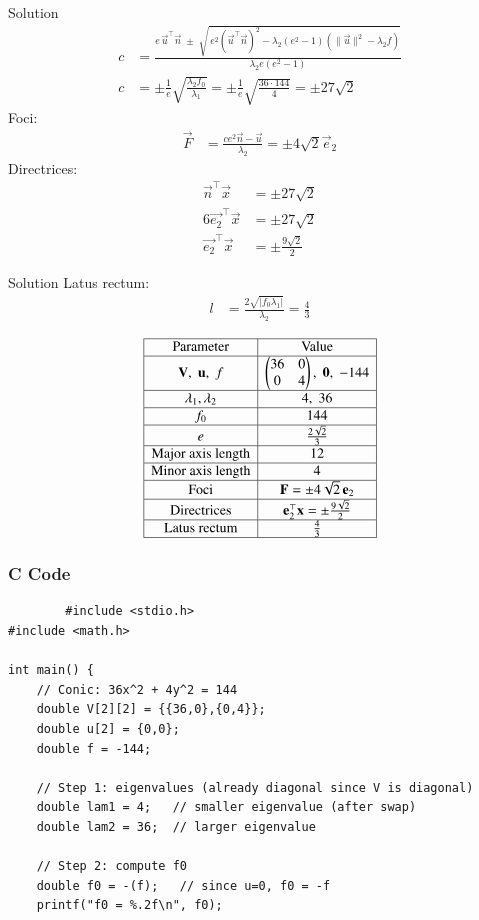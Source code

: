 \documentclass{beamer}
\begin{document}
\begin{frame}{Solution}
\begin{align}
c &= \frac{e\,\vec{u}^\top\vec{n} \;\pm\; 
\sqrt{\,e^{2}\left(\vec{u}^\top\vec{n}\right)^{2} 
- \lambda_{2}\left(e^{2}-1\right)\left(\|\vec{u}\|^{2}-\lambda_{2}f\right)}}{\lambda_{2}e\left(e^{2}-1\right)} \\[6pt]
c &= \pm\frac{1}{e}\sqrt{\frac{\lambda_2 f_0}{\lambda_1}}
= \pm\frac{1}{e}\sqrt{\frac{36\cdot144}{4}}
= \pm 27\sqrt{2} 
\end{align}
Foci:
\begin{align}
\vec{F} &= \frac{c e^2 \vec{n} - \vec{u}}{\lambda_2} 
= \pm 4\sqrt{2}\vec{e}_2
\end{align}
Directrices:
\begin{align}
\vec{n}^\top \vec{x} &= \pm 27\sqrt{2}\\
6\vec{e_2}^\top \vec{x} &= \pm 27\sqrt{2}\\
\vec{e_2}^\top \vec{x} &= \pm \frac{9\sqrt{2}}{2}
\end{align}
\end{frame}
\begin{frame}{Solution}
Latus rectum:
\begin{align}
l &= \frac{2\sqrt{|f_0 \lambda_1|}}{\lambda_2}
= \frac{4}{3}
\end{align}

\[
\begin{array}{|c|c|}
\hline
\text{Parameter} & \text{Value} \\
\hline
\mathbf{V},\;\mathbf{u},\;f & 
\begin{pmatrix}36 & 0\\0 & 4\end{pmatrix}, \; \mathbf{0}, \; -144 \\
\hline
\lambda_1,\lambda_2 & 4,\;36 \\
\hline
f_0 & 144 \\
\hline
e & \tfrac{2\sqrt{2}}{3} \\
\hline
\text{Major axis length} & 12 \\
\hline
\text{Minor axis length} & 4 \\
\hline
\text{Foci} & \mathbf{F}=\pm 4\sqrt{2}\,\mathbf{e}_2 \\
\hline
\text{Directrices} & \mathbf{e}_2^\top \mathbf{x} = \pm \tfrac{9\sqrt{2}}{2} \\
\hline
\text{Latus rectum} & \tfrac{4}{3} \\
\hline
\end{array}
\]

\end{frame}
\begin{frame}[fragile]
    \frametitle{C Code}
    \begin{lstlisting}
        #include <stdio.h>
#include <math.h>

int main() {
    // Conic: 36x^2 + 4y^2 = 144
    double V[2][2] = {{36,0},{0,4}};
    double u[2] = {0,0};
    double f = -144;

    // Step 1: eigenvalues (already diagonal since V is diagonal)
    double lam1 = 4;   // smaller eigenvalue (after swap)
    double lam2 = 36;  // larger eigenvalue

    // Step 2: compute f0
    double f0 = -(f);   // since u=0, f0 = -f
    printf("f0 = %.2f\n", f0);
    \end{lstlisting}
\end{frame}
\end{document}
